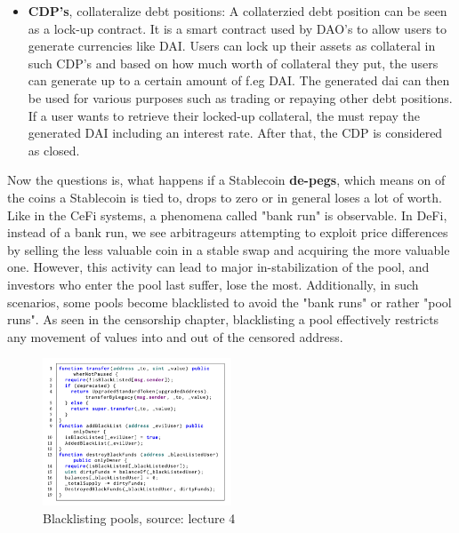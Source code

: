 \documentclass{article}
\begin{document}
\begin{itemize}
\begin{itemize}
\end{itemize}
\begin{itemize}
\item {\textbf{CDP's}, collateralize debt positions}: A collaterzied debt position can be seen as a lock-up contract. It is a smart contract used by DAO's to  allow users to generate currencies like DAI. Users can lock up their assets as collateral in such CDP's and based on how much worth of collateral they put, the users can generate up to a certain amount of f.eg DAI. The generated dai can then be used for various purposes such as trading or repaying other debt positions. If a user wants to retrieve their locked-up collateral, the must repay the generated DAI including an interest rate. After that, the CDP is considered as closed.
\end{itemize}
\end{itemize}
Now the questions is, what happens if a Stablecoin \textbf{de-pegs}, which means on of the coins a Stablecoin is tied to, drops to zero or in general loses a lot of worth. Like in the CeFi systems, a phenomena called "bank run" is observable. In DeFi, instead of a bank run, we see arbitrageurs attempting to exploit price differences by selling the less valuable coin in a stable swap and acquiring the more valuable one. However, this activity can lead to major in-stabilization of the pool, and investors who enter the pool last suffer, lose the most. Additionally, in such scenarios, some pools become blacklisted to avoid the "bank runs" or rather "pool runs". As seen in the censorship chapter, blacklisting a pool effectively restricts any movement of values into and out of the censored address.

\begin{figure}[h]
    \centering
    \includegraphics[width=0.5\textwidth]{Bildschirmfoto 2024-04-02 um 16.33.28.png} %
    \caption{Blacklisting pools, \scriptsize{source: lecture 4}}
    \label{fig:DoS-attack}
\end{figure}
\end{document}
